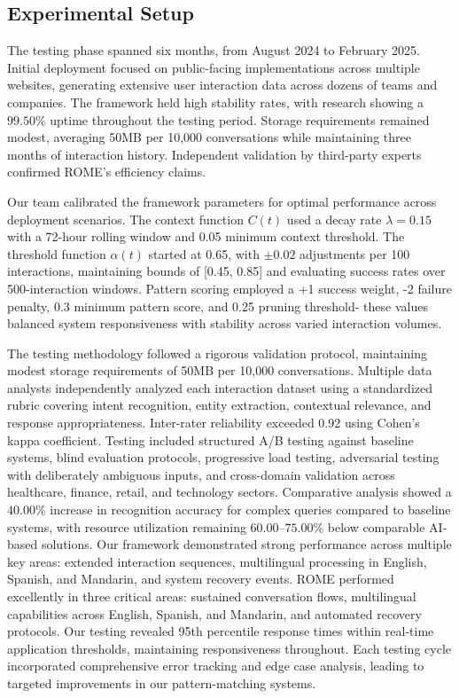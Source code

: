 \documentclass[12pt]{article}
\begin{document}
\subsection{Experimental Setup}
The testing phase spanned six months, from August 2024 to February 2025. Initial deployment focused on public-facing implementations across multiple websites, generating extensive user interaction data across dozens of teams and companies. The framework held high stability rates, with research showing a $99.50\%$ uptime throughout the testing period. Storage requirements remained modest, averaging 50MB per 10,000 conversations while maintaining three months of interaction history. Independent validation by third-party experts confirmed ROME's efficiency claims.

Our team calibrated the framework parameters for optimal performance across deployment scenarios. The context function $C(t)$ used a decay rate $\lambda = 0.15$ with a 72-hour rolling window and 0.05 minimum context threshold. The threshold function $\alpha(t)$ started at 0.65, with $\pm0.02$ adjustments per 100 interactions, maintaining bounds of [0.45, 0.85] and evaluating success rates over 500-interaction windows. Pattern scoring employed a +1 success weight, -2 failure penalty, 0.3 minimum pattern score, and 0.25 pruning threshold- these values balanced system responsiveness with stability across varied interaction volumes.

The testing methodology followed a rigorous validation protocol, maintaining modest storage requirements of 50MB per 10,000 conversations. Multiple data analysts independently analyzed each interaction dataset using a standardized rubric covering intent recognition, entity extraction, contextual relevance, and response appropriateness. Inter-rater reliability exceeded 0.92 using Cohen's kappa coefficient. Testing included structured A/B testing against baseline systems, blind evaluation protocols, progressive load testing, adversarial testing with deliberately ambiguous inputs, and cross-domain validation across healthcare, finance, retail, and technology sectors. Comparative analysis showed a $40.00\%$ increase in recognition accuracy for complex queries compared to baseline systems, with resource utilization remaining $60.00$--$75.00\%$ below comparable AI-based solutions. Our framework demonstrated strong performance across multiple key areas: extended interaction sequences, multilingual processing in English, Spanish, and Mandarin, and system recovery events. ROME performed excellently in three critical areas: sustained conversation flows, multilingual capabilities across English, Spanish, and Mandarin, and automated recovery protocols. Our testing revealed 95th percentile response times within real-time application thresholds, maintaining responsiveness throughout. Each testing cycle incorporated comprehensive error tracking and edge case analysis, leading to targeted improvements in our pattern-matching systems.
\end{document}
